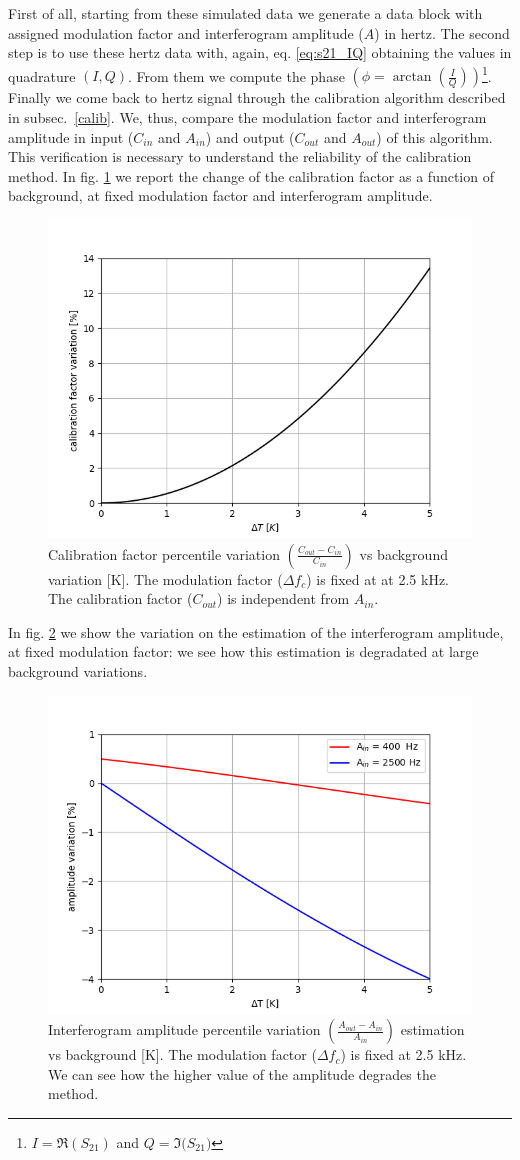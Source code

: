 \documentclass[twocolumn,traditabstract]{aa}\\
\begin{document}
First of all, starting from these simulated data we generate a data block with assigned modulation factor and interferogram amplitude ($A$) in hertz. The second step is to use these hertz data with, again, eq. \ref{eq:s21_IQ} obtaining the values in quadrature $(I,Q)$. From them we compute the phase $\left( \phi=\arctan\left(\frac{I}{Q}\right) \right)$\footnote{ $I = \Re(S_{21})$ and $Q = \Im({S_{21})}$ }. Finally we come back to hertz signal through the calibration algorithm described in subsec.~\ref{calib}. We, thus, compare the modulation factor and interferogram amplitude in input ($C_{in}$ and $A_{in}$) and output ($C_{out}$ and $A_{out}$) of this algorithm. This verification is necessary to understand the reliability of the calibration method. In fig. \ref{fig:cal_bck} we report the change of the calibration factor as a function of background, at fixed modulation factor and interferogram amplitude.

\begin{figure}[htf]
	\centering
	\includegraphics[width=.5\textwidth]{3.acqui/calibration_factor_variation.png}
	\caption{Calibration factor percentile variation $\left( \frac{C_{out}-C_{in}}{C_{in}} \right)$ vs background variation [K]. The modulation factor ($\Delta f_c$) is fixed at at 2.5 kHz. The calibration factor ($C_{out}$) is independent from $A_{in}$.}
	\label{fig:cal_bck}
\end{figure}

\noindent In fig. \ref{fig:amp_bck} we show the variation on the estimation of the interferogram amplitude, at fixed modulation factor: we see how this estimation is degradated at large background variations.

\begin{figure}[htf]
	\centering
	\includegraphics[width=.5\textwidth]{3.acqui/amplitude_variation.png}
	\caption{Interferogram amplitude percentile variation $\left( \frac{A_{out}-A_{in}}{A_{in}} \right)$ estimation vs background [K]. The modulation factor ($\Delta f_c$) is fixed at 2.5 kHz. We can see how the higher value of the amplitude degrades the method.}
	\label{fig:amp_bck}
\end{figure}
\end{document}
